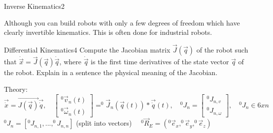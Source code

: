 \begin{questions}
\begin{question}{Inverse Kinematics}{2}
\begin{answer}
   Although you can build robots with only a few degrees of freedom which have clearly invertible kinematics. This is often done for industrial robots.
   
	

	\end{answer}

\end{question}


\begin{question}{Differential Kinematics}{4}
Compute the Jacobian matrix $\vec{J}(\vec{q})$ of the robot such that $\dot{\vec{x}}=\vec{J}(\vec{q})\dot{\vec{q}}$, where $\dot{\vec{q}}$ is the first time derivatives of the state vector $\vec{q}$ of the robot. Explain in a sentence the physical meaning of the Jacobian.

\begin{answer}
	Theory:\\
	$\vec{\dot{x}} = \vec{J(\vec{q})} \vec{\dot{q}}, \quad \begin{bmatrix}
	^0\vec{v}_n(t) \\ ^0\vec{\omega}_n(t)
	\end{bmatrix}= ^0\vec{J}_n(\vec{q}(t)) * \vec{\dot{q}}(t), \quad ^0J_n = \begin{bmatrix}
	^0J_{n,v}\\^0J_{n,\omega}
	\end{bmatrix}, \quad ^0J_n \in 6 x n \quad$$^0J_n = [^0J_{n,1}, ..., ^0J_{n,n}]$ (split into vectors)
	$\quad ^0\vec{R}_E=(^0\vec{e}_x,^0\vec{e}_y,^0\vec{e}_z)$
	\\
	

\end{answer}
\end{question}
\end{questions}
